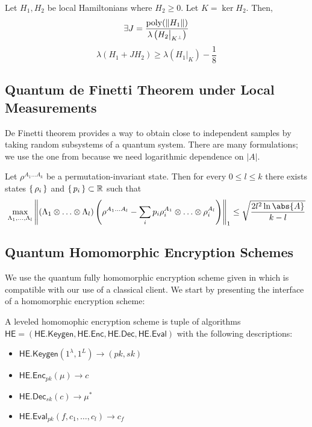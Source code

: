 \begin{thm}
	\label{thm:projection}
	Let $H_1, H_2$ be local Hamiltonians where $H_2\geq0$. Let $K=\ker H_2$. Then,
	$$\exists J=\frac{\operatorname*{\operatorname{poly}}(\left\lVert H_1\right\rVert)}{\lambda\left(H_2\big|_{K^\bot}\right)}$$
	$$\lambda(H_1+JH_2)\geq\lambda\left(H_1\big|_K\right)-\frac{1}{8}$$
\end{thm}

\subsection{Quantum de Finetti Theorem under Local Measurements}

De Finetti theorem provides a way to obtain close to independent samples by taking random subsystems of a quantum system.
There are many formulations; we use the one from \cite{Brandão2017} because we need logarithmic dependence on $|A|$.
\begin{thm}
	\label{deFinetti}
	Let $\rho^{A_1\ldots A_k}$ be a permutation-invariant state. Then for every $0\leq l\leq k$ there exists states $\set{\rho_i}$ and $\set{p_i}\subset\mathbb{R}$ such that
	$$\max_{\Lambda_1,\ldots,\Lambda_l}\norm{(\Lambda_1\otimes\ldots\otimes\Lambda_l)\left(\rho^{A_1\ldots A_l}-\sum_ip_i\rho_i^{A_1}\otimes\ldots\otimes\rho_i^{A_l}\right)}_1\leq\sqrt{\frac{2l^2\ln\abs{A}}{k-l}}$$
\end{thm}

\subsection{Quantum Homomorphic Encryption Schemes}

\def\QHE{\mathsf{QHE}}
\def\QGen{\mathsf{QHE.Keygen}}
\def\QEnc{\mathsf{QHE.Enc}}
\def\QEval{\mathsf{QHE.Eval}}
\def\QDec{\mathsf{QHE.Dec}}

We use the quantum fully homomorphic encryption scheme given in \cite{mahadev_qfhe} which is compatible with our use of a classical client. We start by presenting the interface of a homomorphic encryption scheme:
\begin{dfn}
	A leveled homomophic encryption scheme is tuple of algorithms $\mathsf{HE}=(\mathsf{HE.Keygen}, \mathsf{HE.Enc}, \mathsf{HE.Dec}, \mathsf{HE.Eval})$ with the following descriptions:
	\begin{itemize}
		\item $\mathsf{HE.Keygen}(1^\lambda, 1^L)\rightarrow(pk, sk)$
		\item $\mathsf{HE.Enc}_{pk}(\mu)\rightarrow c$
		\item $\mathsf{HE.Dec}_{sk}(c)\rightarrow \mu^*$
		\item $\mathsf{HE.Eval}_{pk}(f, c_1, \ldots, c_l)\rightarrow c_f$
	\end{itemize}
\end{dfn}

